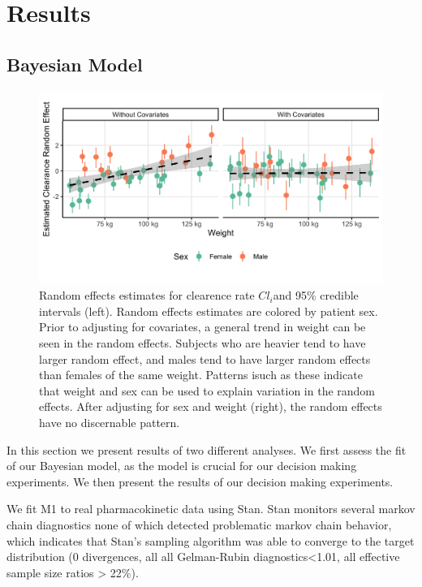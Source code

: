 \section{Results}
\subsection{Bayesian Model}



\begin{figure}
	\centering
	\includegraphics[width=\linewidth]{"figures/random_effects_change.png"}
	\caption{Random effects estimates for clearence rate $ Cl_i $and 95\% credible intervals (left).  Random effects estimates are colored by patient sex.  Prior to adjusting for covariates, a general trend in weight can be seen in the random effects.  Subjects who are heavier tend to have larger random effect, and males tend to have larger random effects than females of the same weight.  Patterns isuch as these indicate that weight and sex can be used to explain variation in the random effects.  After adjusting for sex and weight (right), the random effects have no discernable pattern.}
	\label{fig:randomeffectschange}
\end{figure}

In this section we present results of two different analyses.  We first assess the fit of our Bayesian model, as the model is crucial for our decision making experiments.  We then present the results of our decision making experiments.

We fit M1 to real pharmacokinetic data using Stan.  Stan monitors several markov chain diagnostics none of which detected problematic markov chain behavior, which indicates that Stan’s sampling algorithm was able to converge to the target distribution (0 divergences, all all Gelman-Rubin diagnostics<1.01, all effective sample size ratios  > 22\%).  

